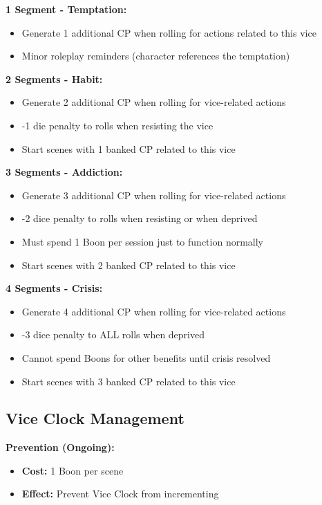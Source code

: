 \documentclass[11pt]{article}
\begin{document}
\textbf{1 Segment - Temptation:}
\begin{itemize}
    \item Generate 1 additional CP when rolling for actions related to this vice
    \item Minor roleplay reminders (character references the temptation)
\end{itemize}

\textbf{2 Segments - Habit:}
\begin{itemize}
    \item Generate 2 additional CP when rolling for vice-related actions
    \item -1 die penalty to rolls when resisting the vice
    \item Start scenes with 1 banked CP related to this vice
\end{itemize}

\textbf{3 Segments - Addiction:}
\begin{itemize}
    \item Generate 3 additional CP when rolling for vice-related actions
    \item -2 dice penalty to rolls when resisting or when deprived
    \item Must spend 1 Boon per session just to function normally
    \item Start scenes with 2 banked CP related to this vice
\end{itemize}

\textbf{4 Segments - Crisis:}
\begin{itemize}
    \item Generate 4 additional CP when rolling for vice-related actions
    \item -3 dice penalty to ALL rolls when deprived
    \item Cannot spend Boons for other benefits until crisis resolved
    \item Start scenes with 3 banked CP related to this vice
\end{itemize}

\subsection{Vice Clock Management}

\textbf{Prevention (Ongoing):}
\begin{itemize}
    \item \textbf{Cost:} 1 Boon per scene
    \item \textbf{Effect:} Prevent Vice Clock from incrementing
\end{itemize}
\end{document}

